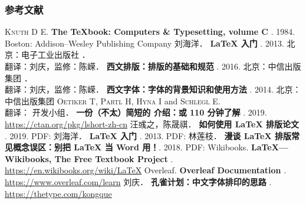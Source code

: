 \begin{frame}[fragile]
\frametitle{参考文献}
\begin{multicols}{2}
\tiny
\newcommand\BOOK[1]{\textbf{#1}}
\newcommand\TAG[1]{\CASE{[#1]}}
\begin{thebibliography}{99}
  \bibitem{}
    \textsc{Knuth D E}.
    \newblock \BOOK{The \TeX book: Computers \& Typesetting, volume C} \TAG{M}. 1984.
    \newblock Boston: Addison--Wesley Publishing Company
  \bibitem{}
    刘海洋．
    \newblock \BOOK{\LaTeX{} 入门} \TAG{M}. 2013.
    \newblock 北京：电子工业出版社
  \bibitem{}
    ．\\
    翻译：刘庆，监修：陈嵘．
    \newblock \BOOK{西文排版：排版的基础和规范} \TAG{M}. 2016.
    \newblock 北京：中信出版集团
  \bibitem{}
    ．\\
    翻译：刘庆，监修：陈嵘．
    \newblock \BOOK{西文字体：字体的背景知识和使用方法} \TAG{M}. 2014.
    \newblock 北京：中信出版集团
  \bibitem{}
    \textsc{Oetiker T}, \textsc{Partl H}, \textsc{Hyna I} and \textsc{Schlegl E}.\\
    翻译：\CTeX{} 开发小组．
    \newblock \BOOK{一份（不太）简短的 \LaTeXe{} 介绍：或 110 分钟了解 \LaTeXe{}} \TAG{EB/OL}. 2019.
    \newblock \url{https://ctan.org/pkg/lshort-zh-cn}
  \bibitem{}
    汪彧之，陈晟祺．
    \newblock \BOOK{如何使用 \LaTeX{} 排版论文} \TAG{EB/OL}. 2019.
    \newblock PDF:
      \href{https://github.com/tuna/thulib-latex-talk/raw/master/latex-talk.pdf}{\faDownload}
  \bibitem{}
    刘海洋．
    \newblock \BOOK{\LaTeX{} 入门} \TAG{EB/OL}. 2013.
    \newblock PDF:
      \href{https://bbs.pku.edu.cn/attach/e7/f2/e7f2bb698b9c3672/tex_intro_talk.pdf}{\faDownload}
  \bibitem{}
    林莲枝．
    \newblock \BOOK{漫谈 \LaTeX{} 排版常见概念误区：别把 \LaTeX{} 当 Word 用！}\TAG{EB/OL}. 2018.
    \newblock PDF:
      \href{http://static.latexstudio.net/wp-content/uploads/2018/03/LianTze-presentation-0320-forReading.pdf}{\faDownload}
  \bibitem{}
    Wikibooks.
    \newblock \BOOK{\LaTeX{}---Wikibooks, The Free Textbook Project} \TAG{EB/OL}.
    \newblock \url{https://en.wikibooks.org/wiki/LaTeX}
  \bibitem{}
    Overleaf.
    \newblock \BOOK{Overleaf Documentation} \TAG{EB/OL}.
    \newblock \url{https://www.overleaf.com/learn}
  \bibitem{}
    刘庆．
    \newblock \BOOK{孔雀计划：中文字体排印的思路} \TAG{EB/OL}.
    \newblock \url{https://thetype.com/kongque}
\end{thebibliography}
\end{multicols}
\end{frame}
